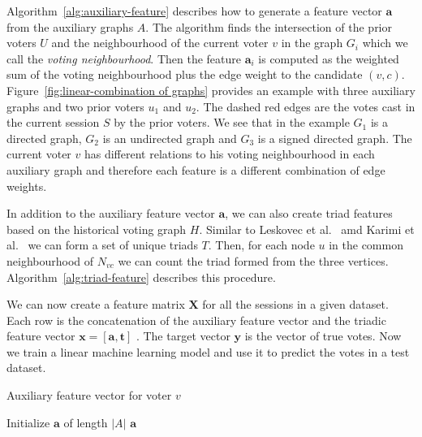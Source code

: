 Algorithm~\ref{alg:auxiliary-feature} describes how to generate a feature vector $\mathbf{a}$ from the auxiliary graphs $A$.
The algorithm finds the intersection of the prior voters $U$ and the neighbourhood of the current voter $v$ in the graph $G_i$ which we call the \textit{voting neighbourhood}.
Then the feature $\mathbf{a}_i$ is computed as the weighted sum of the voting neighbourhood plus the edge weight to the candidate $(v,c)$.
Figure~\ref{fig:linear-combination of graphs} provides an example with three auxiliary graphs and two prior voters $u_1$ and $u_2$.
The dashed red edges are the votes cast in the current session $S$ by the prior voters.
We see that in the example $G_1$ is a directed graph, $G_2$ is an undirected graph and $G_3$ is a signed directed graph.
The current voter $v$ has different relations to his voting neighbourhood in each auxiliary graph and therefore each feature is a different combination of edge weights. 

In addition to the auxiliary feature vector $\mathbf{a}$, we can also create triad features based on the historical voting graph $H$.
Similar to Leskovec et al.\ \cite{leskovec2010predicting} amd Karimi et al.\ \cite{karimi2019multicongress} we can form a set of unique triads $T$.
Then, for each node $u$ in the common neighbourhood of $N_{vc}$ we can count the triad formed from the three vertices.
Algorithm~\ref{alg:triad-feature} describes this procedure. 

We can now create a feature matrix $\mathbf{X}$ for all the sessions in a given dataset.
Each row is the concatenation of the auxiliary feature vector and the triadic feature vector $\mathbf{x} = [\mathbf{a},\mathbf{t}]$ .
The target vector $\mathbf{y}$ is the vector of true votes.
Now we train a linear machine learning model and use it to predict the votes in a test dataset.

\begin{algorithm}[htp]
    \DontPrintSemicolon
    \caption{Auxiliary feature vector for voter $v$ }
    \label{alg:auxiliary-feature}
    Initialize $\mathbf{a}$ of length $|A|$\;
    \Return $\mathbf{a}$
\end{algorithm}

